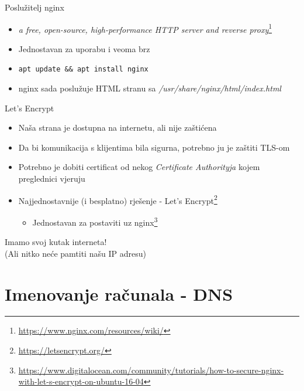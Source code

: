 \documentclass[t]{beamer}
\begin{document}
\begin{frame}{Poslužitelj nginx}
    \begin{itemize}
        \item \textit{a free, open-source, high-performance HTTP server and reverse proxy}\footnote{\url{https://www.nginx.com/resources/wiki/}}
        \item Jednostavan za uporabu i veoma brz
        \item \texttt{apt update \&\& apt install nginx}
        \item nginx sada poslužuje HTML stranu sa \textit{/usr/share/nginx/html/index.html}
    \end{itemize}
\end{frame}

\begin{frame}{Let's Encrypt}
    \begin{itemize}
        \item Naša strana je dostupna na internetu, ali nije zaštićena
        \item Da bi komunikacija s klijentima bila sigurna, potrebno ju je zaštiti TLS-om
        \item Potrebno je dobiti certificat od nekog \textit{Certificate Authorityja} kojem preglednici vjeruju
        \item Najjednostavnije (i besplatno) rješenje - Let's Encrypt\footnote{\url{https://letsencrypt.org/}}
        \begin{itemize}
            \item Jednostavan za postaviti uz nginx\footnote{\url{https://www.digitalocean.com/community/tutorials/how-to-secure-nginx-with-let-s-encrypt-on-ubuntu-16-04}}
        \end{itemize}
    \end{itemize}
\end{frame}

\begin{frame}
	\vspace*{\fill}
		\begin{center}
			\Huge{Imamo svoj kutak interneta!} \\
			\small{(Ali nitko neće pamtiti našu IP adresu)}
		\end{center}
	\vspace*{\fill}
\end{frame}

\section{Imenovanje računala - DNS}
\end{document}
